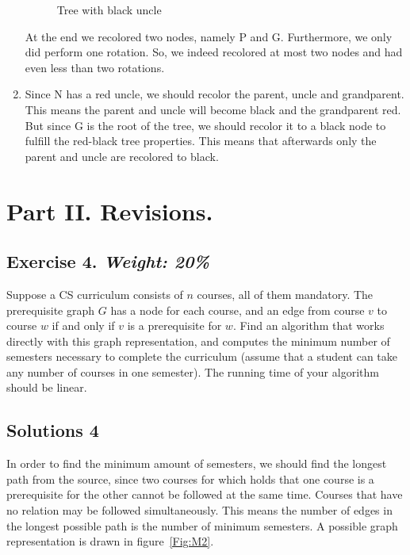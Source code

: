 \documentclass{article}
\begin{document}
\begin{enumerate}
\begin{figure}[h]
\begin{center}
	\caption{Tree with black uncle} \label{Fig:M1}
	\end{center}
\end{figure}
At the end we recolored two nodes, namely P and G. Furthermore, we only did perform one rotation. So, we indeed recolored at most two nodes and had even less than two rotations.
	\item Since N has a red uncle, we should recolor the parent, uncle and grandparent. This means the parent and uncle will become black and the grandparent red. But since G is the root of the tree, we should recolor it to a black node to fulfill the red-black tree properties. This means that afterwards only the parent and uncle are recolored to black.
\end{enumerate}

\newpage
\section*{Part II. Revisions.}

\subsection*{Exercise 4. \textit{Weight: 20\%}}
Suppose a CS curriculum consists of $n$ courses, all of them mandatory.
The prerequisite graph $G$ has a node for each course, and an edge from course $v$ to course $w$ if and only if $v$ is a prerequisite for $w$. Find an algorithm that works directly with this graph representation, and computes the minimum number of semesters necessary to complete the curriculum (assume that a student can take any number of courses in one semester). The running time of your algorithm should be linear.

\subsection*{Solutions 4}
In order to find the minimum amount of semesters, we should find the longest path from the source, since two courses for which holds that one course is a prerequisite for the other cannot be followed at the same time. Courses that have no relation may be followed simultaneously. This means the number of edges in the longest possible path is the number of minimum semesters. A possible graph representation is drawn in figure~\ref{Fig:M2}.
\end{document}

